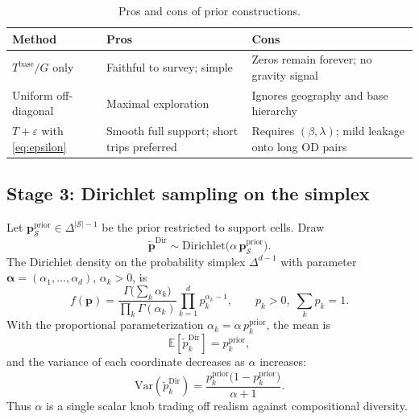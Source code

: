 \documentclass[11pt,a4paper]{report}
\newcommand{\mathbfp}{\mathbf{p}}
\begin{document}
\begin{table}[ht]
\centering
\caption{Pros and cons of prior constructions.}
\label{tab:pros_prior}
\small
\begin{tabular}{@{}p{3.2cm}p{5.1cm}p{5.1cm}@{}}
\toprule
\textbf{Method} & \textbf{Pros} & \textbf{Cons} \\
\midrule
$T^{\mathrm{base}}/G$ only &
Faithful to survey; simple &
Zeros remain forever; no gravity signal \\
Uniform off-diagonal &
Maximal exploration &
Ignores geography and base hierarchy \\
$T+\varepsilon$ with \eqref{eq:epsilon} &
Smooth full support; short trips preferred &
Requires $(\beta,\lambda)$; mild leakage onto long OD pairs \\
\bottomrule
\end{tabular}
\end{table}

\subsection{Stage 3: Dirichlet sampling on the simplex}
\label{sec:ch1-dirichlet}

Let $\mathbfp^{\mathrm{prior}}_{\mathcal{S}}\in\Delta^{|\mathcal{S}|-1}$ be the prior restricted to support cells. Draw
\begin{equation}
    \tilde{\mathbfp}^{\mathrm{Dir}}
    \sim \mathrm{Dirichlet}\!\bigl(\alpha\,\mathbfp^{\mathrm{prior}}_{\mathcal{S}}\bigr).
    \label{eq:dirichlet}
\end{equation}
The Dirichlet density on the probability simplex $\Delta^{d-1}$ with parameter $\boldsymbol{\alpha}=(\alpha_1,\ldots,\alpha_d)$, $\alpha_k>0$, is
\begin{equation}
    f(\mathbfp)
    = \frac{\Gamma\!\bigl(\sum_k \alpha_k\bigr)}{\prod_k \Gamma(\alpha_k)}
    \prod_{k=1}^{d} p_k^{\alpha_k-1},
    \qquad p_k>0,\; \sum_k p_k=1.
    \label{eq:dirichlet_pdf}
\end{equation}
With the proportional parameterization $\alpha_k = \alpha\, p^{\mathrm{prior}}_k$, the mean is
\begin{equation}
    \mathbb{E}[\tilde{p}_k^{\mathrm{Dir}}] = p^{\mathrm{prior}}_k,
\end{equation}
and the variance of each coordinate decreases as $\alpha$ increases:
\begin{equation}
    \mathrm{Var}(\tilde{p}_k^{\mathrm{Dir}})
    = \frac{p^{\mathrm{prior}}_k\bigl(1-p^{\mathrm{prior}}_k\bigr)}{\alpha+1}.
    \label{eq:dirichlet_var}
\end{equation}
Thus $\alpha$ is a single scalar knob trading off realism against compositional diversity.
\end{document}
